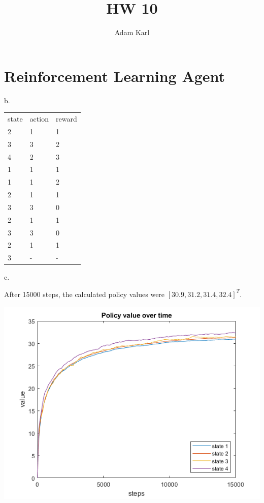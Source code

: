 \documentclass{article}
\title{HW 10}
\author{Adam Karl}
\begin{document}
\maketitle

\section{Reinforcement Learning Agent}

b.

\begin{table}[htb]
\begin{tabular}{lll}
state & action & reward \\
2     & 1      & 1      \\
3     & 3      & 2      \\
4     & 2      & 3      \\
1     & 1      & 1      \\
1     & 1      & 2      \\
2     & 1      & 1      \\
3     & 3      & 0      \\
2     & 1      & 1      \\
3     & 3      & 0      \\
2     & 1      & 1      \\
3     & -      & -     
\end{tabular}
\end{table}

\noindent 
c.

\noindent 
After 15000 steps, the calculated policy values were $[30.9,31.2,31.4,32.4]^T$.

\begin{center}
    \includegraphics[scale=1]{1c.png}
\end{center}
\end{document}
